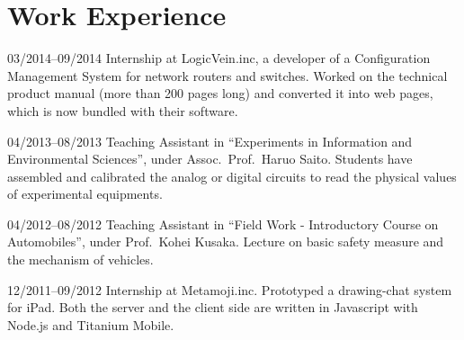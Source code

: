 \documentclass[letterpaper,12pt]{article}
\begin{document}
\section{Work Experience}

\begin{CV}
\item[03/2014--09/2014] Internship at LogicVein.inc,
 a developer of a Configuration Management System
 for network routers and switches.
 Worked on %
 the technical product manual (more than 200 pages long) %
 and converted it into 
 web pages, which is now bundled with their software.

\item[04/2013--08/2013] Teaching Assistant in ``Experiments in
 Information and Environmental Sciences'', under
 Assoc.\ Prof.\ Haruo Saito.
 Students have assembled and calibrated the analog or digital
 circuits to read the physical values of experimental equipments.

\item[04/2012--08/2012] Teaching Assistant in ``Field Work -
 Introductory Course on Automobiles'', under
 Prof.\ Kohei Kusaka.
 Lecture on basic safety measure and the mechanism of vehicles.

\item[12/2011--09/2012] Internship at Metamoji.inc.  Prototyped a
  drawing-chat system for iPad. Both the server and the client side are
  written in Javascript with Node.js and Titanium Mobile.
\end{CV}
\end{document}
